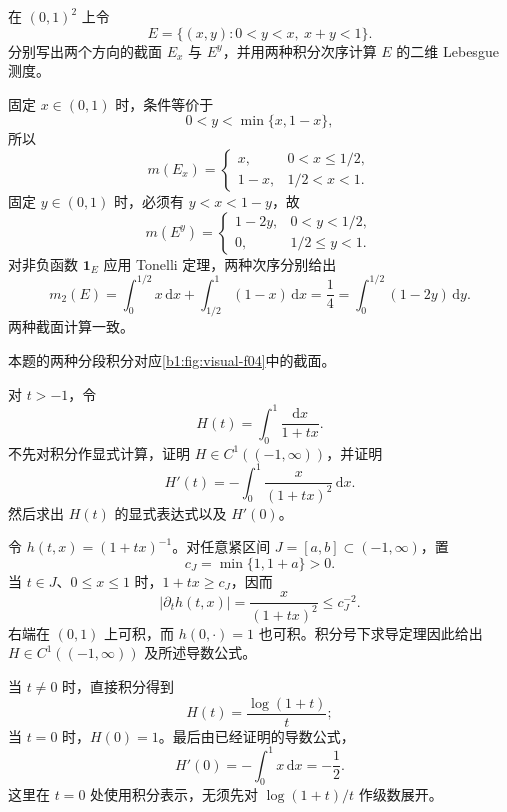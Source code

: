 \begin{exercise}\label{b1:ex:07-basic-sections-tonelli}
在 \((0,1)^2\) 上令
\[
E=\{(x,y):0<y<x,\ x+y<1\}.
\]
分别写出两个方向的截面 \(E_x\) 与 \(E^y\)，并用两种积分次序计算 \(E\) 的二维 Lebesgue 测度。
\end{exercise}
\begin{solution}
固定 \(x\in(0,1)\) 时，条件等价于
\[
0<y<\min\{x,1-x\},
\]
所以
\[
m(E_x)=
\begin{cases}
x,&0<x\leq1/2,\\
1-x,&1/2<x<1.
\end{cases}
\]
固定 \(y\in(0,1)\) 时，必须有 \(y<x<1-y\)，故
\[
m(E^y)=
\begin{cases}
1-2y,&0<y<1/2,\\
0,&1/2\leq y<1.
\end{cases}
\]
对非负函数 \(\mathbf1_E\) 应用 Tonelli 定理，两种次序分别给出
\[
m_2(E)=\int_0^{1/2}x\,\mathrm{d}x+\int_{1/2}^1(1-x)\,\mathrm{d}x
=\frac14
=\int_0^{1/2}(1-2y)\,\mathrm{d}y.
\]
两种截面计算一致。
\end{solution}



本题的两种分段积分对应\cref{b1:fig:visual-f04}中的截面。


\begin{exercise}\label{b1:ex:07-parameter-differentiation}
对 \(t>-1\)，令
\[
H(t)=\int_0^1\frac{\mathrm{d}x}{1+tx}.
\]
不先对积分作显式计算，证明 \(H\in C^1((-1,\infty))\)，并证明
\[
H'(t)=-\int_0^1\frac{x}{(1+tx)^2}\,\mathrm{d}x.
\]
然后求出 \(H(t)\) 的显式表达式以及 \(H'(0)\)。
\end{exercise}
\begin{solution}
令 \(h(t,x)=(1+tx)^{-1}\)。对任意紧区间 \(J=[a,b]\subset(-1,\infty)\)，置
\[
c_J=\min\{1,1+a\}>0.
\]
当 \(t\in J\)、\(0\leq x\leq1\) 时，\(1+tx\geq c_J\)，因而
\[
|\partial_th(t,x)|=\frac{x}{(1+tx)^2}\leq c_J^{-2}.
\]
右端在 \((0,1)\) 上可积，而 \(h(0,\cdot)=1\) 也可积。积分号下求导定理因此给出 \(H\in C^1((-1,\infty))\) 及所述导数公式。

当 \(t\neq0\) 时，直接积分得到
\[
H(t)=\frac{\log(1+t)}{t};
\]
当 \(t=0\) 时，\(H(0)=1\)。最后由已经证明的导数公式，
\[
H'(0)=-\int_0^1x\,\mathrm{d}x=-\frac12.
\]
这里在 \(t=0\) 处使用积分表示，无须先对 \(\log(1+t)/t\) 作级数展开。
\end{solution}

